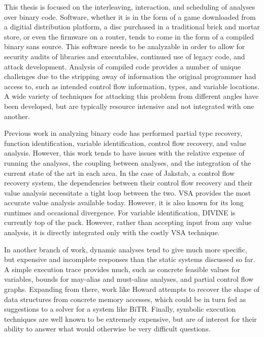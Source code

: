 \newcommand{\sysname}{Holmes}
This thesis is focused on the interleaving, interaction, and scheduling of analyses over binary code.
Software, whether it is in the form of a game downloaded from a digitial distribution platform, a disc purchased in a traditional brick and mortar store, or even the firmware on a router, tends to come in the form of a compiled binary sans source.
This software needs to be analyzable in order to allow for security audits of libraries and executables, continued use of legacy code, and attack development.
Analysis of compiled code provides a number of unique challenges due to the stripping away of information the original programmer had access to, such as intended control flow information, types, and variable locations.
A wide variety of techniques for attacking this problem from different angles have been developed, but are typically resource intensive and not integrated with one another.

Previous work in analyzing binary code has performed partial type recovery, function identification, variable identification, control flow recovery, and value analysis.
However, this work tends to have issues with the relative expense of running the analyses, the coupling between analyses, and the integration of the current state of the art in each area.
In the case of Jakstab, a control flow recovery system, the dependencies between their control flow recovery and their value analysis necessitate a tight loop between the two.
VSA provides the most accurate value analysis available today. However, it is also known for its long runtimes and occasional divergence.
For variable identification, DIVINE is currently top of the pack. However, rather than accepting input from any value analysis, it is directly integrated only with the costly VSA technique.

In another branch of work, dynamic analyses tend to give much more specific, but expensive and incomplete responses than the static systems discussed so far.
A simple execution trace provides much, such as concrete feasible values for variables, bounds for may-alias and must-alias analyses, and partial control flow graphs.
Expanding from there, work like Howard attempts to recover the shape of data structures from concrete memory accesses, which could be in turn fed as suggestions to a solver for a system like BiTR.
Finally, symbolic execution techniques are well known to be extremely expensive, but are of interest for their ability to answer what would otherwise be very difficult questions.

